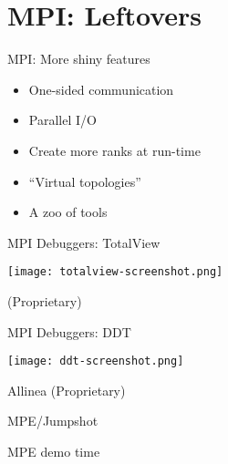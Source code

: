 \documentclass[english,compress]{beamer}
\begin{document}
\section{MPI: Leftovers}
\begin{frame}{MPI: More shiny features}
  \begin{itemize}
    \item One-sided communication
    \item Parallel I/O
    \item Create more ranks at run-time
    \item ``Virtual topologies''
    \item A zoo of tools
  \end{itemize}
\end{frame}
\begin{frame}{MPI Debuggers: TotalView}
  \begin{center}
  \texttt{[image: totalview-screenshot.png]}

  (Proprietary)
  \end{center}
\end{frame}
\begin{frame}{MPI Debuggers: DDT}
  \begin{center}
  \texttt{[image: ddt-screenshot.png]}

  Allinea 
  (Proprietary)
  \end{center}
\end{frame}
\begin{frame}{MPE/Jumpshot}
  \begin{center}
  \Huge MPE demo time
  \end{center}
\end{frame}
\long{}
\end{document}
